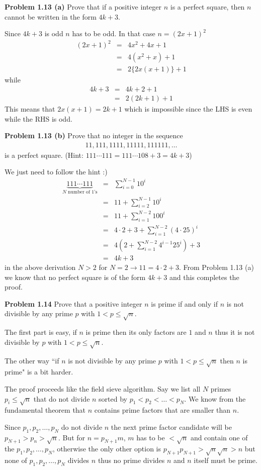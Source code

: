 \documentclass[aps,preprint,preprintnumbers,nofootinbib,showpacs,prd]{revtex4-1}
\newcommand{\nbea}{\begin{eqnarray*}}
\newcommand{\neea}{\end{eqnarray*}}
\begin{document}
{\bf Problem 1.13 (a)} Prove that if a positive integer $n$ is a perfect square, then $n$ cannot be written in the form $4k + 3$.

Since $4k+3$ is odd $n$ has to be odd. In that case $n = (2x+1)^2$
%
\nbea
(2x+1)^2 & = & 4x^2 + 4x + 1 \\
& = & 4(x^2 + x) + 1 \\
& = & 2 \{2x(x + 1)\} + 1
\neea
%
while
%
\nbea
4k + 3 & = & 4k + 2 + 1 \\
& = & 2(2k+1) + 1
\neea
%
This means that $2 x (x + 1) = 2k + 1$ which is impossible since the LHS is even while the RHS is odd.

{\bf Problem 1.13 (b)} Prove that no integer in the sequence
%
\nbea
11, 111, 1111, 11111, 111111, \dots
\neea
%
is a perfect square. (Hint: $111 \cdots 111 = 111 \cdots 108 + 3 = 4k+3$)

We just need to follow the hint :)
%
\nbea
\underbrace{111 \cdots 111}_\text{$N$ number of 1's} & = & \sum_{i=0}^{N-1} 10^i \\
& = & 11 + \sum_{i=2}^{N-1} 10^i \\
& = & 11 + \sum_{i=1}^{N-2} 100^i \\
& = & 4 \cdot 2 + 3 + \sum_{i=1}^{N-2} (4 \cdot 25)^i \\
& = & 4 \left(2 + \sum_{i=1}^{N-2} 4^{i-1} 25^i \right ) + 3 \\
& = & 4k + 3
\neea
%
in the above derivation $N > 2$ for $N=2 \to 11 = 4 \cdot 2 + 3$. From Problem 1.13 (a) we know that no perfect square is of the form $4k + 3$ and this completes the proof.

{\bf Problem 1.14} Prove that a positive integer $n$ is prime if and only if $n$ is not divisible by any prime $p$ with $1 < p \le \sqrt{n}$.

The first part is easy, if $n$ is prime then its only factors are $1$ and $n$ thus it is not divisible by $p$ with $1 < p \le \sqrt{n}$.

The other way ``if $n$ is not divisible by any prime $p$ with $1 < p \le \sqrt{n}$ then $n$ is prime" is a bit harder.

The proof proceeds like the field sieve algorithm. Say we list all $N$ primes $p_i \le \sqrt{n}$ that do not divide $n$ sorted by $p_1 < p_2 < \dots < p_N$. We know from the fundamental theorem that $n$ contains prime factors that are smaller than $n$.

Since $p_1, p_2, \dots, p_N$ do not divide $n$ the next prime factor candidate will be $p_{N+1} > p_n > \sqrt{n}$. But for $n = p_{N+1} m$, $m$ has to be $< \sqrt{n}$ and contain one of the $p_1, p_2, \dots, p_N$, otherwise the only other option is $p_{N+1}p_{N+1} > \sqrt{n}\sqrt{n} > n$ but none of $p_1, p_2, \dots, p_N$ divides $n$ thus no prime divides $n$ and $n$ itself must be prime.
\end{document}
